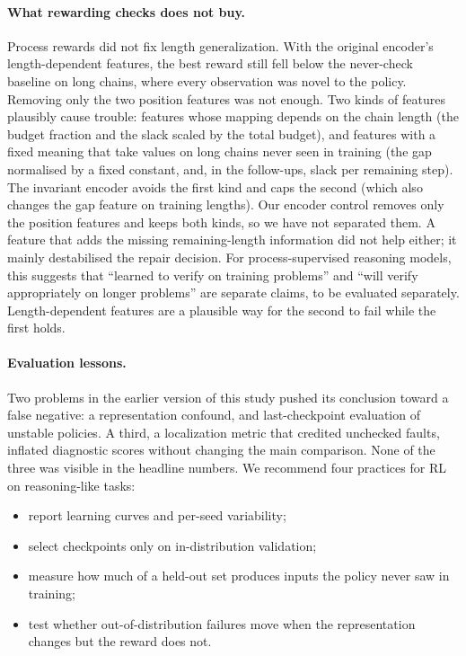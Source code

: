 \paragraph{What rewarding checks does not buy.}
Process rewards did not fix length generalization. With the original encoder's length-dependent features, the best reward still fell below the never-check baseline on long chains, where every observation was novel to the policy. Removing only the two position features was not enough. Two kinds of features plausibly cause trouble: features whose mapping depends on the chain length (the budget fraction and the slack scaled by the total budget), and features with a fixed meaning that take values on long chains never seen in training (the gap normalised by a fixed constant, and, in the follow-ups, slack per remaining step). The invariant encoder avoids the first kind and caps the second (which also changes the gap feature on training lengths). Our encoder control removes only the position features and keeps both kinds, so we have not separated them. A feature that adds the missing remaining-length information did not help either; it mainly destabilised the repair decision. For process-supervised reasoning models, this suggests that ``learned to verify on training problems'' and ``will verify appropriately on longer problems'' are separate claims, to be evaluated separately. Length-dependent features are a plausible way for the second to fail while the first holds.

\paragraph{Evaluation lessons.}
Two problems in the earlier version of this study pushed its conclusion toward a false negative: a representation confound, and last-checkpoint evaluation of unstable policies. A third, a localization metric that credited unchecked faults, inflated diagnostic scores without changing the main comparison. None of the three was visible in the headline numbers. We recommend four practices for RL on reasoning-like tasks:
\begin{itemize}
  \item report learning curves and per-seed variability;
  \item select checkpoints only on in-distribution validation;
  \item measure how much of a held-out set produces inputs the policy never saw in training;
  \item test whether out-of-distribution failures move when the representation changes but the reward does not.
\end{itemize}

